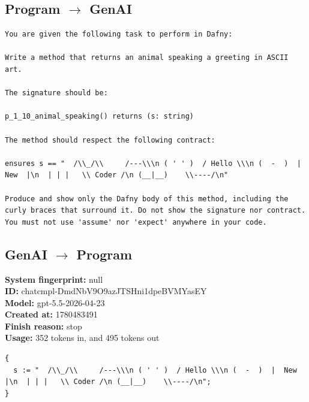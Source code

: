 \documentclass{article}
\begin{document}
\subsection*{Program $\rightarrow$ GenAI}
\begin{lstlisting}
You are given the following task to perform in Dafny:

Write a method that returns an animal speaking a greeting in ASCII art.

The signature should be:

p_1_10_animal_speaking() returns (s: string)

The method should respect the following contract:

ensures s == "  /\\_/\\     /---\\\n ( ' ' )  / Hello \\\n (  -  )  |  New  |\n  | | |   \\ Coder /\n (__|__)    \\----/\n"

Produce and show only the Dafny body of this method, including the curly braces that surround it. Do not show the signature nor contract. You must not use 'assume' nor 'expect' anywhere in your code.
\end{lstlisting}
\subsection*{GenAI $\rightarrow$ Program}
\textbf{System fingerprint: }null
\\\textbf{ID: }chatcmpl-DmdNbV9O9azJTSHni1dpeBVMYasEY
\\\textbf{Model: }gpt-5.5-2026-04-23
\\\textbf{Created at: }1780483491
\\\textbf{Finish reason: }stop
\\\textbf{Usage: }352 tokens in, and 495 tokens out
\begin{lstlisting}
{
  s := "  /\\_/\\     /---\\\n ( ' ' )  / Hello \\\n (  -  )  |  New  |\n  | | |   \\ Coder /\n (__|__)    \\----/\n";
}
\end{lstlisting}
\end{document}
